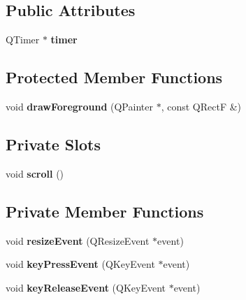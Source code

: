 \subsection*{Public Attributes}
\begin{DoxyCompactItemize}
\item 
\hypertarget{classGraphicsView_a331b14add14bb266ce37b41305c4b6f6}{
QTimer $\ast$ {\bfseries timer}}
\label{classGraphicsView_a331b14add14bb266ce37b41305c4b6f6}

\end{DoxyCompactItemize}
\subsection*{Protected Member Functions}
\begin{DoxyCompactItemize}
\item 
\hypertarget{classGraphicsView_a67aeaac6690f80da59b7500a57d6e009}{
void {\bfseries drawForeground} (QPainter $\ast$, const QRectF \&)}
\label{classGraphicsView_a67aeaac6690f80da59b7500a57d6e009}

\end{DoxyCompactItemize}
\subsection*{Private Slots}
\begin{DoxyCompactItemize}
\item 
\hypertarget{classGraphicsView_a4db1497eb472d1d3bc2cfb98d7246293}{
void {\bfseries scroll} ()}
\label{classGraphicsView_a4db1497eb472d1d3bc2cfb98d7246293}

\end{DoxyCompactItemize}
\subsection*{Private Member Functions}
\begin{DoxyCompactItemize}
\item 
\hypertarget{classGraphicsView_a8f6f709b0cc6cb273a22e351ee25e6f6}{
void {\bfseries resizeEvent} (QResizeEvent $\ast$event)}
\label{classGraphicsView_a8f6f709b0cc6cb273a22e351ee25e6f6}

\item 
\hypertarget{classGraphicsView_a6fab10657f5a7a0875cf7f399ae49b6e}{
void {\bfseries keyPressEvent} (QKeyEvent $\ast$event)}
\label{classGraphicsView_a6fab10657f5a7a0875cf7f399ae49b6e}

\item 
\hypertarget{classGraphicsView_afa70df9353346637663598337be73c47}{
void {\bfseries keyReleaseEvent} (QKeyEvent $\ast$event)}
\label{classGraphicsView_afa70df9353346637663598337be73c47}

\end{DoxyCompactItemize}
